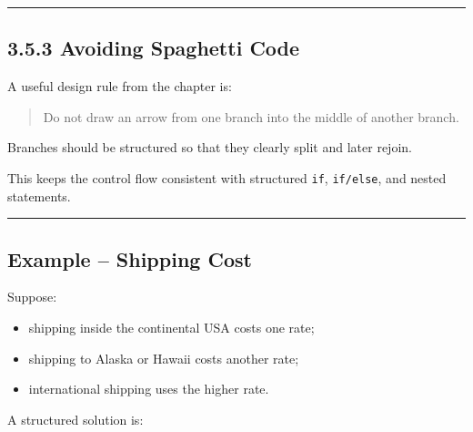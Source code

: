 \documentclass[
  11pt,
  a4paper,
]{article}
\newenvironment{Shaded}{}{}
\newcommand{\BuiltInTok}[1]{\textcolor[rgb]{0.00,0.50,0.00}{#1}}
\newcommand{\ControlFlowTok}[1]{\textcolor[rgb]{0.00,0.44,0.13}{\textbf{#1}}}
\newcommand{\FloatTok}[1]{\textcolor[rgb]{0.25,0.63,0.44}{#1}}
\newcommand{\KeywordTok}[1]{\textcolor[rgb]{0.00,0.44,0.13}{\textbf{#1}}}
\newcommand{\NormalTok}[1]{#1}
\newcommand{\OperatorTok}[1]{\textcolor[rgb]{0.40,0.40,0.40}{#1}}
\newcommand{\SpecialCharTok}[1]{\textcolor[rgb]{0.25,0.44,0.63}{#1}}
\newcommand{\StringTok}[1]{\textcolor[rgb]{0.25,0.44,0.63}{#1}}
\providecommand{\tightlist}{%
  \setlength{\itemsep}{0pt}\setlength{\parskip}{0pt}}
\begin{document}
\begin{center}\rule{0.5\linewidth}{0.5pt}\end{center}

\subsection{3.5.3 Avoiding Spaghetti
Code}\label{avoiding-spaghetti-code}

A useful design rule from the chapter is:

\begin{quote}
Do not draw an arrow from one branch into the middle of another branch.
\end{quote}

Branches should be structured so that they clearly split and later
rejoin.

This keeps the control flow consistent with structured \texttt{if},
\texttt{if/else}, and nested statements.

\begin{center}\rule{0.5\linewidth}{0.5pt}\end{center}

\subsection{Example -- Shipping Cost}\label{example-shipping-cost}

Suppose:

\begin{itemize}
\tightlist
\item
  shipping inside the continental USA costs one rate;
\item
  shipping to Alaska or Hawaii costs another rate;
\item
  international shipping uses the higher rate.
\end{itemize}

A structured solution is:

\begin{Shaded}
\end{Shaded}
\end{document}
